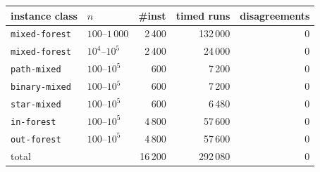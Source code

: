 \begin{tabular}{@{}llrrr@{}}
\toprule
instance class & $n$ & \#inst & timed runs & disagreements \\
\midrule
\texttt{mixed-forest} & $100$--$1\,000$ & 2\,400 & 132\,000 & 0 \\
\texttt{mixed-forest} & $10^4$--$10^5$ & 2\,400 & 24\,000 & 0 \\
\texttt{path-mixed} & $100$--$10^5$ & 600 & 7\,200 & 0 \\
\texttt{binary-mixed} & $100$--$10^5$ & 600 & 7\,200 & 0 \\
\texttt{star-mixed} & $100$--$10^5$ & 600 & 6\,480 & 0 \\
\texttt{in-forest} & $100$--$10^5$ & 4\,800 & 57\,600 & 0 \\
\texttt{out-forest} & $100$--$10^5$ & 4\,800 & 57\,600 & 0 \\
\midrule
total &  & 16\,200 & 292\,080 & 0 \\
\bottomrule
\end{tabular}
